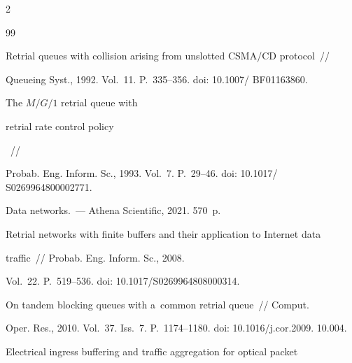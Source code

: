 \begin{multicols}{2}
{{\begin{thebibliography}{99}




Retrial queues with collision arising from unslotted {CSMA/CD} protocol~//


Queueing Syst., 1992.  Vol.~11. P.~335--356. doi: 10.1007/ BF01163860.







 {The $M/G/1$ retrial queue with


retrial rate control policy}~//


Probab.  Eng. Inform. Sc., 1993.  Vol.~7. P.~29--46. doi: 10.1017/ S0269964800002771.









{Data networks}.~--- Athena Scientific, 2021.  570~p.









Retrial networks with finite buffers and their application to Internet data 


traffic~//  Probab. Eng. Inform. Sc., 2008. 


Vol.~22. P.~519--536. doi: 10.1017/S0269964808000314.









{On tandem blocking queues with a~common retrial queue}~// Comput.  


Oper. Res., 2010. Vol.~37. Iss.~7. P.~1174--1180. doi: 10.1016/j.cor.2009. 10.004.















{Electrical ingress buffering and traffic aggregation for optical packet 


}
\end{thebibliography}}}
\end{multicols}
